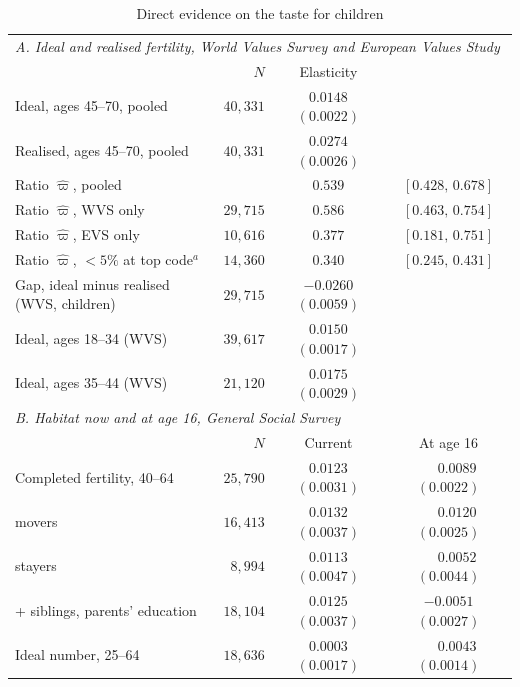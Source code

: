\documentclass[11pt]{article}
\begin{document}
\begin{table}[h!]\centering
\begin{threeparttable}
\caption{Direct evidence on the taste for children}
\label{tab:prefs}
\footnotesize\setlength{\tabcolsep}{3.5pt}
\begin{tabular}{lrcc}
\toprule
\multicolumn{4}{l}{\emph{A. Ideal and realised fertility, World Values Survey and European Values Study}}\\
& $N$ & Elasticity & \\
\midrule
Ideal, ages 45--70, pooled                & $40{,}331$ & $0.0148$ $(0.0022)$ & \\
Realised, ages 45--70, pooled             & $40{,}331$ & $0.0274$ $(0.0026)$ & \\
Ratio $\hat\varpi$, pooled                  &            & $0.539$ & $[0.428,\,0.678]$\\
Ratio $\hat\varpi$, WVS only                & $29{,}715$ & $0.586$ & $[0.463,\,0.754]$\\
Ratio $\hat\varpi$, EVS only                & $10{,}616$ & $0.377$ & $[0.181,\,0.751]$\\
Ratio $\hat\varpi$, $<5\%$ at top code$^{a}$  & $14{,}360$ & $0.340$ & $[0.245,\,0.431]$\\
Gap, ideal minus realised (WVS, children) & $29{,}715$ & $-0.0260$ $(0.0059)$ & \\
Ideal, ages 18--34 (WVS)                  & $39{,}617$ & $0.0150$ $(0.0017)$ & \\
Ideal, ages 35--44 (WVS)                  & $21{,}120$ & $0.0175$ $(0.0029)$ & \\
\midrule
\multicolumn{4}{l}{\emph{B. Habitat now and at age 16, General Social Survey}}\\
& $N$ & Current & At age 16\\
\midrule
Completed fertility, 40--64               & $25{,}790$ & $0.0123$ $(0.0031)$ & $\phantom{-}0.0089$ $(0.0022)$\\
\quad movers                             & $16{,}413$ & $0.0132$ $(0.0037)$ & $\phantom{-}0.0120$ $(0.0025)$\\
\quad stayers                            & $8{,}994$  & $0.0113$ $(0.0047)$ & $\phantom{-}0.0052$ $(0.0044)$\\
\quad + siblings, parents' education     & $18{,}104$ & $0.0125$ $(0.0037)$ & $-0.0051$ $(0.0027)$\\
Ideal number, 25--64                     & $18{,}636$ & $0.0003$ $(0.0017)$ & $\phantom{-}0.0043$ $(0.0014)$\\

\end{tabular}
\end{threeparttable}
\end{table}
\end{document}
